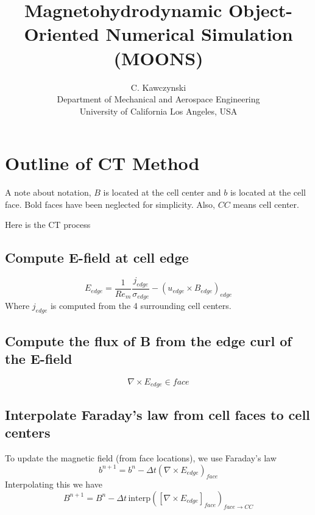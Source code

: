 \documentclass[11pt]{article}
\begin{document}
\doublespacing
\title{Magnetohydrodynamic Object-Oriented Numerical Simulation (MOONS)}
\author{C. Kawczynski \\
Department of Mechanical and Aerospace Engineering \\
University of California Los Angeles, USA\\
}
\maketitle

\section{Outline of CT Method}
A note about notation, $B$ is located at the cell center and $b$ is located at the cell face. Bold faces have been neglected for simplicity. Also, $CC$ means cell center.

Here is the CT process
\subsection{Compute E-field at cell edge}
\begin{equation}
	E_{edge} = \frac{1}{Re_m} \frac{j_{edge}}{\sigma_{edge}} - 
	(u_{edge} \times B_{edge})_{edge}
\end{equation}
Where $j_{edge}$ is computed from the 4 surrounding cell centers.

\subsection{Compute the flux of B from the edge curl of the E-field}

\begin{equation}
	\nabla \times E_{edge} \in face
\end{equation}

\subsection{Interpolate Faraday's law from cell faces to cell centers}
To update the magnetic field (from face locations), we use Faraday's law
\begin{equation}
	b^{n+1} = b^{n} - \Delta t
	\left(
	\nabla \times E_{edge}
	\right)_{face}
\end{equation}
Interpolating this we have
\begin{equation}
	B^{n+1} = B^{n} - \Delta t \,
	\text{interp}(
	\left[
	\nabla \times E_{edge}
	\right]_{face}
	)_{face \rightarrow CC}
\end{equation}
\end{document}
